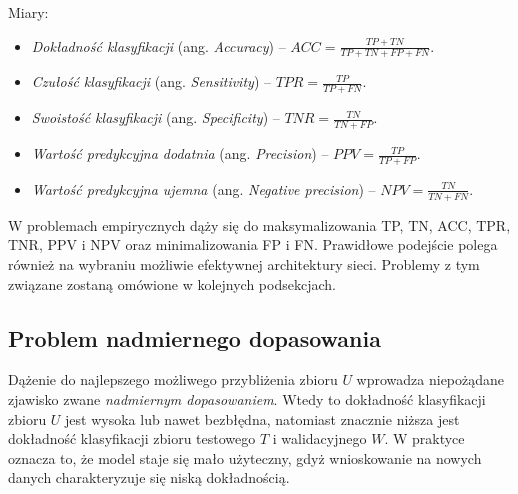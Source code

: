 Miary:
\begin{itemize}[noitemsep,nolistsep]
	\item \textit{Dokładność klasyfikacji} (ang. \textit{Accuracy}) -- $ACC = \frac{TP + TN}{TP+TN+FP+FN}$.
	\item \textit{Czułość klasyfikacji} (ang. \textit{Sensitivity}) -- $TPR = \frac{TP}{TP + FN}$.
	\item \textit{Swoistość klasyfikacji} (ang. \textit{Specificity}) -- $TNR = \frac{TN}{TN + FP}$.
	\item \textit{Wartość predykcyjna dodatnia} (ang. \textit{Precision}) -- $PPV = \frac{TP}{TP + FP}$.
	\item \textit{Wartość predykcyjna ujemna} (ang. \textit{Negative precision}) -- $NPV = \frac{TN}{TN + FN}$.
\end{itemize}

W problemach empirycznych dąży się do maksymalizowania TP, TN, ACC, TPR, TNR, PPV i NPV oraz minimalizowania FP i FN. Prawidłowe podejście polega również na wybraniu możliwie efektywnej architektury sieci. Problemy z tym związane zostaną omówione w kolejnych podsekcjach.

\subsection{Problem nadmiernego dopasowania}
\label{sec-overffiting}

Dążenie do najlepszego możliwego przybliżenia zbioru $U$ wprowadza niepożądane zjawisko zwane \textit{nadmiernym dopasowaniem}. Wtedy to dokładność klasyfikacji zbioru $U$ jest wysoka lub nawet bezbłędna, natomiast znacznie niższa jest dokładność klasyfikacji zbioru testowego $T$ i walidacyjnego $W$. W praktyce oznacza to, że model staje się mało użyteczny, gdyż wnioskowanie na nowych danych charakteryzuje się niską dokładnością.

